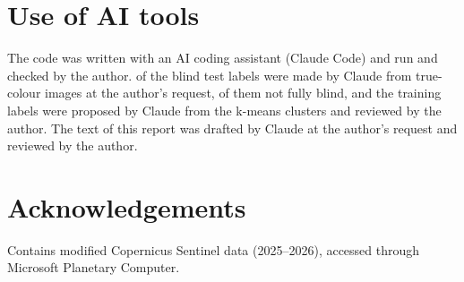 \documentclass[10pt]{article}
\begin{document}
\section*{Use of AI tools}
The code was written with an AI coding assistant (Claude Code) and run and checked by the author.
\NClaudeLabels{} of the blind test labels were made by Claude from true-colour images at the author's
request, \NNotFullyBlind{} of them not fully blind, and the training labels were proposed by Claude
from the k-means clusters and reviewed by the author. The text of this report was drafted by Claude
at the author's request and reviewed by the author.

\section*{Acknowledgements}
Contains modified Copernicus Sentinel data (2025--2026), accessed through Microsoft Planetary Computer.



\end{document}
